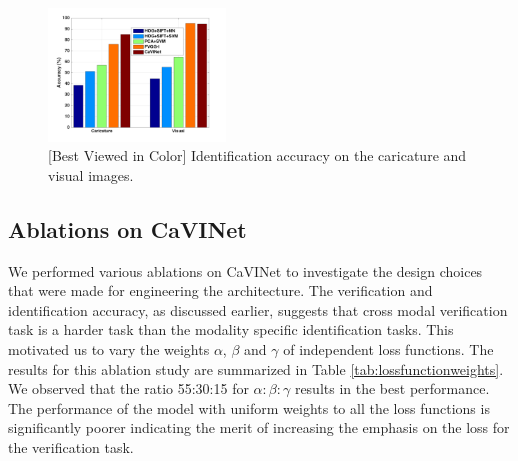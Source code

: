 \begin{figure}[h]
\centering
\includegraphics[width=0.42\textwidth]{images/iden-base.png}
\caption{[Best Viewed in Color] Identification accuracy on the caricature and visual images.}
\label{fig:identification}
\end{figure}
\subsection{Ablations on CaVINet}

We performed various ablations on CaVINet to investigate the design choices that were made for engineering the architecture.
The verification and identification accuracy, as discussed earlier, suggests that cross modal verification task is a harder task than the modality specific identification tasks. This motivated us to vary the weights $\alpha$, $\beta$ and $\gamma$ of independent loss functions. The results for this ablation study are summarized in Table \ref{tab:lossfunctionweights}. We observed that the ratio 55:30:15 for $\alpha:\beta:\gamma$ results in the best performance. The performance of the model with uniform weights to all the loss functions is significantly poorer indicating the merit of increasing the emphasis on the loss for the verification task. 
\begin{table}[!h]
  \begin{center}
    
    \bigskip
    \caption{Ablation Study on the optimal ratio of the loss function weights $\alpha:\beta:\gamma$.}
    \label{tab:lossfunctionweights}
  \end{center}
\end{table}

